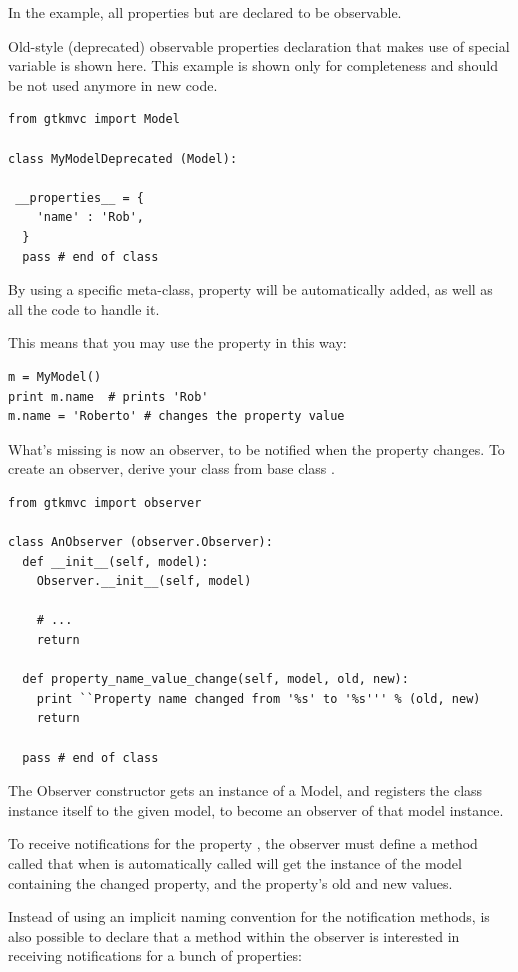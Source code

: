 In the example, all properties but  are declared
to be observable.

Old-style (deprecated) observable properties declaration that makes
use of special variable \OPvar is shown here. This example is shown
only for completeness and should be not used anymore in new code.

{ \codesize 
\begin{verbatim} 
from gtkmvc import Model

class MyModelDeprecated (Model):

 __properties__ = { 
    'name' : 'Rob',
  }
  pass # end of class
\end{verbatim}
}


By using a specific meta-class, property  will be
automatically added, as well as all the code to handle it.

This means that you may use the property in this way:
{ \codesize 
\begin{verbatim} 
m = MyModel()
print m.name  # prints 'Rob'
m.name = 'Roberto' # changes the property value
\end{verbatim}
}

What's missing is now an observer, to be notified when the property
changes. To create an observer, derive your class from base class
.

{ \codesize 
\begin{verbatim} 
from gtkmvc import observer

class AnObserver (observer.Observer):
  def __init__(self, model):
    Observer.__init__(self, model)

    # ...
    return

  def property_name_value_change(self, model, old, new):
    print ``Property name changed from '%s' to '%s''' % (old, new)
    return

  pass # end of class
\end{verbatim}
}

The Observer constructor gets an instance of a Model, and registers the
class instance itself to the given model, to become an observer of
that model instance.

To receive notifications for the property , the
observer must define a method called
 that when is automatically
called will get the instance of the model containing the changed
property, and the property's old and new values.

Instead of using an implicit naming convention for the notification
methods, is also possible to declare that a method within the observer
is interested in receiving notifications for a bunch of properties:


